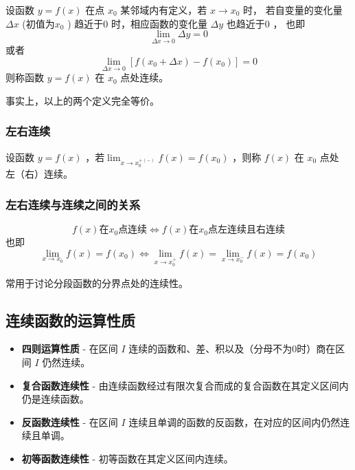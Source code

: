 \begin{Def}[连续]

    设函数 $ y=f(x) $ 在点 $ x_0 $ 某邻域内有定义，若 $ x\rightarrow x_0 $ 时，
    若自变量的变化量 $ \Delta x $ (初值为$ x_0 $ ) 趋近于$ 0 $ 时，相应函数的变化量 $ \Delta y $ 也趋近于$ 0 $ ，
    也即 $$ {\displaystyle\lim_{\Delta x\rightarrow 0}}\Delta y=0 $$ 或者 $$
        {\displaystyle\lim_{\Delta x\rightarrow 0}}[f(x_0+\Delta x)-f(x_0)]=0
    $$ 
    则称函数 $ y=f(x) $ 在 $ x_0 $ 点处连续。
\end{Def}

事实上，以上的两个定义完全等价。

\subsubsection{左右连续}

\begin{Def}[左、右连续的定义]

    设函数 $ y=f(x) $ ，若$ {\displaystyle\lim_{x\rightarrow x_0^{+(-)}}}f(x)=f(x_0) $ ，则称 $ f(x) $ 在 $ x_0 $ 点处
    左（右）连续。
\end{Def}

\subsubsection{左右连续与连续之间的关系}

\begin{Theo}[]

    $$
        f(x)\textrm{在}x_0\textrm{点连续}\Leftrightarrow
        f(x)\textrm{在}x_0\textrm{点左连续且右连续}
    $$ 
    也即$$
        {\displaystyle\lim_{x\rightarrow x_0}}f(x)=f(x_0)\Leftrightarrow
        {\displaystyle\lim_{x\rightarrow x_0^+}}f(x)={\displaystyle\lim_{x\rightarrow x_0^-}}f(x)=f(x_0)
    $$ 
\end{Theo}

常用于讨论分段函数的分界点处的连续性。

\subsection{连续函数的运算性质}

\begin{itemize}
    \item \textbf{四则运算性质} - 在区间 $ I $ 连续的函数和、差、积以及（分母不为0时）商在区间 $ I $ 仍然连续。
    \item \textbf{复合函数连续性} - 由连续函数经过有限次复合而成的复合函数在其定义区间内仍是连续函数。
    \item \textbf{反函数连续性} - 在区间 $ I $ 连续且单调的函数的反函数，在对应的区间内仍然连续且单调。
    \item \textbf{初等函数连续性} - 初等函数在其定义区间内连续。
\end{itemize}

